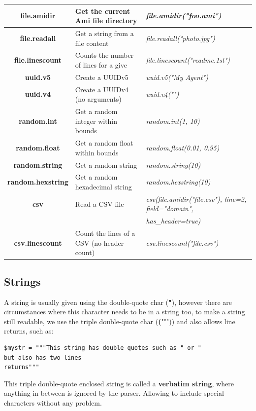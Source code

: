 \documentclass[10pt]{article}
\begin{document}
\begin{tabular}{|c|l|l|}
  \textbf{file.amidir} & Get the current Ami file directory & \textit{file.amidir("foo.ami")}\\
  \hline
  \textbf{file.readall} & Get a string from a file content & \textit{file.readall("photo.jpg")}\\
  \hline
  \textbf{file.linescount} & Counts the number of lines for a give & \textit{file.linescount("readme.1st")}\\
  \hline
  \textbf{uuid.v5} & Create a UUIDv5 & \textit{uuid.v5("My Agent")}\\
  \hline
  \textbf{uuid.v4} & Create a UUIDv4 (no arguments) & \textit{uuid.v4("")}\\
  \hline
  \textbf{random.int} & Get a random integer within bounds & \textit{random.int(1, 10)}\\
  \hline
  \textbf{random.float} & Get a random float within bounds & \textit{random.float(0.01, 0.95)}\\
  \hline
  \textbf{random.string} & Get a random string & \textit{random.string(10)}\\
  \hline
  \textbf{random.hexstring} & Get a random hexadecimal string & \textit{random.hexstring(10)}\\
  \hline
  \textbf{csv} & Read a CSV file & \textit{csv(file.amidir("file.csv"), line=2, field="domain",}\\
    & & \textit{has\_header=true)}\\  
  \hline
  \textbf{csv.linescount} & Count the lines of a CSV (no header count)& \textit{csv.linescount("file.csv")}\\
  \hline
\end{tabular}

\subsection{Strings}

A string is usually given using the double-quote char (\textbf{"}), however there are circumstances where this character needs to be in a string too, to make a string still readable, we use the triple double-quote char (\textbf(""")) and also allows line returns, such as:

\begin{lstlisting}[caption={Verbatim String},captionpos=b]
$mystr = """This string has double quotes such as " or "
but also has two lines
returns"""
\end{lstlisting}

This triple double-quote enclosed string is called a \textbf{verbatim string}, where anything in between is ignored by the parser. Allowing to include special characters without any problem.
\end{document}
